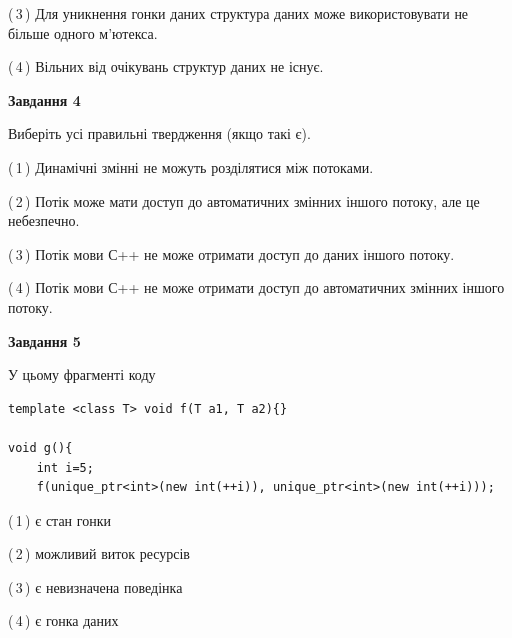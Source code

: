 \documentclass[12pt, ukrainian]{article}
\begin{document}
\begin {large}
{(\,3\,) Для уникнення гонки даних структура даних може використовувати не більше одного м’ютекса.%

(\,4\,) Вільних від очікувань структур даних не існує.%



\begin{center}
\textbf{Завдання 4}
\end{center}
Виберіть усі правильні твердження (якщо такі є).\par
\vspace{2mm}

(\,1\,) Динамічні змінні не можуть розділятися між потоками.%

(\,2\,) Потік може мати доступ до автоматичних змінних іншого потоку, але це небезпечно.%

(\,3\,) Потік мови С++ не може отримати доступ до даних іншого потоку.%

(\,4\,) Потік мови С++ не може отримати доступ до автоматичних змінних іншого потоку.%



\begin{center}
\textbf{Завдання 5}
\end{center}
У цьому фрагменті коду
\begin{verbatim}
template <class T> void f(T a1, T a2){}

void g(){
    int i=5;
    f(unique_ptr<int>(new int(++i)), unique_ptr<int>(new int(++i)));
\end{verbatim}

(\,1\,) є стан гонки%

(\,2\,) можливий виток ресурсів%

(\,3\,) є невизначена поведінка%

(\,4\,) є гонка даних%


}
\end {large}
\end{document}
